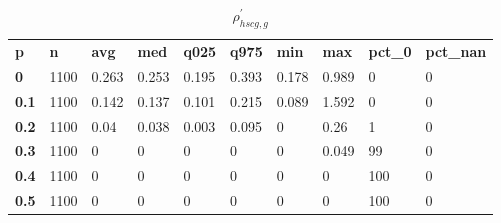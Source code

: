 \begin{table}[h]
 \centering 
\footnotesize
\caption{$\rho_{hscg,g}^\prime $}
\label{tab:alphahscgg}
\begin{tabular}[h]{| l l l l l l l l l l|
    } \hline
\textbf{ p} & \textbf{ n} & \textbf{ avg} & \textbf{ med} & \textbf{ q025} & \textbf{ q975} & \textbf{ min} & \textbf{ max} & \textbf{ pct\_0} & \textbf{ pct\_nan}
           \\
  \textbf{  0} & 1100 & 0.263 & 0.253 & 0.195 & 0.393 & 0.178 & 0.989 &   0 & 0
           \\
  \textbf{0.1} & 1100 & 0.142 & 0.137 & 0.101 & 0.215 & 0.089 & 1.592 &   0 & 0
           \\
  \textbf{0.2} & 1100 &  0.04 & 0.038 & 0.003 & 0.095 &     0 &  0.26 &   1 & 0
           \\
  \textbf{0.3} & 1100 &     0 &     0 &     0 &     0 &     0 & 0.049 &  99 & 0
           \\
  \textbf{0.4} & 1100 &     0 &     0 &     0 &     0 &     0 &     0 & 100 & 0
           \\
  \textbf{0.5} & 1100 &     0 &     0 &     0 &     0 &     0 &     0 & 100 & 0
           \\
 \hline \end{tabular}
 \end{table}
